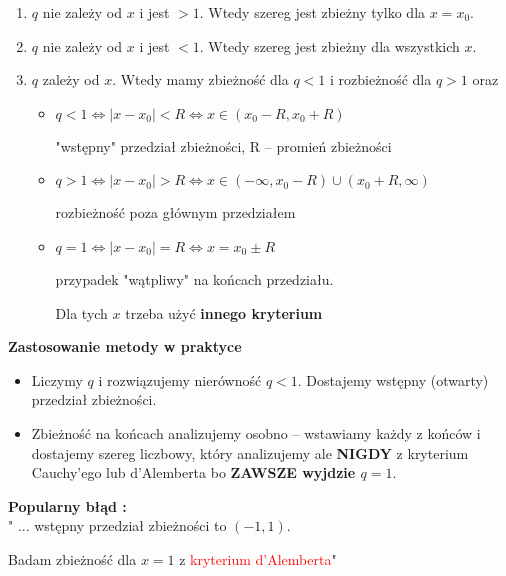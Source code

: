 \begin{enumerate}
    \item $q$ nie zależy od $x$ i jest $> 1$. Wtedy szereg jest zbieżny tylko dla $x = x_0$.
    \item $q$ nie zależy od $x$ i jest $< 1$. Wtedy szereg jest zbieżny dla wszystkich $x$.
    \item $q$ zależy od $x$. Wtedy mamy zbieżność dla $q < 1$ i rozbieżność dla $q > 1$ oraz
    
    \begin{itemize}
        \item $ q < 1 \Leftrightarrow |x - x_0| < R \Leftrightarrow x \in (x_0 - R, x_0 + R) $
        
        "wstępny" przedział zbieżności, R -- promień zbieżności

        \item $ q > 1 \Leftrightarrow |x - x_0| > R \Leftrightarrow x \in (-\infty, x_0 - R)\cup(x_0 + R, \infty) $

        rozbieżność poza głównym przedziałem
        
        \item $ q = 1 \Leftrightarrow |x - x_0| = R \Leftrightarrow x = x_0 \pm R $
        
        przypadek "wątpliwy" na końcach przedziału.
        
        Dla tych $x$ trzeba użyć \textbf{innego kryterium} \\
    \end{itemize}
\end{enumerate}

\textbf{Zastosowanie metody w praktyce}

\begin{itemize}
    \item Liczymy $q$ i rozwiązujemy nierówność $q < 1$. Dostajemy wstępny (otwarty) przedział zbieżności.
    \item Zbieżność na końcach analizujemy osobno -- wstawiamy każdy z końców i dostajemy szereg liczbowy, który analizujemy
    ale \textbf{NIGDY} z kryterium Cauchy'ego lub d'Alemberta bo \textbf{ZAWSZE wyjdzie $q = 1$}. \\
\end{itemize}

\textbf{Popularny błąd :} \\

" ... wstępny przedział zbieżności to $(-1, 1)$.

Badam zbieżność dla $x=1$ z \textcolor{red}{kryterium d'Alemberta}"


